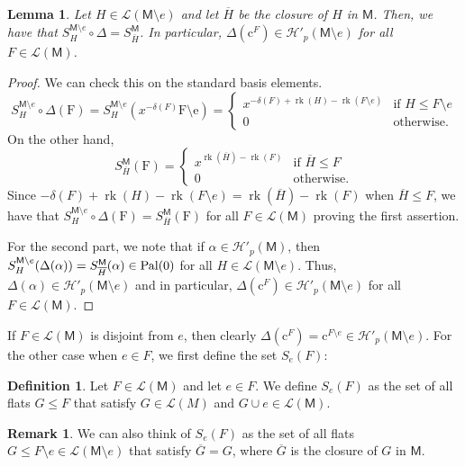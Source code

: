 \documentclass[12pt,letterpaper,english]{amsart}
\theoremstyle{teoremas}
\newtheorem{lemma}[theorem]{Lemma}
\theoremstyle{definition}
\newtheorem{definition}[theorem]{Definition}
\newtheorem{remark}[theorem]{Remark}
\DeclareMathOperator{\rk}{rk}
\newcommand{\M}{\mathsf{M}}
\newcommand{\cH}{\mathcal{H}}
\newcommand{\calL}{\mathcal{L}}
\newcommand{\Ebasis}[1]{\mathrm{#1}}
\newcommand{\Cbasis}[1]{\mathrm{c}^{#1}}
\newcommand{\pal}{\normalfont\text{Pal}}
\begin{document}
\begin{lemma}
    Let \(H \in \calL(\M \setminus e)\) and let \(\overline{H}\) be the closure of \(H\) in \(\M\).
    Then, we have that \(S^{\M\setminus e}_H \circ \Delta =
    S^{\M}_{\overline{H}}\).
    In particular, \(\Delta(\Cbasis{F}) \in \cH'_p(\M \setminus e)\) for all \(F \in \calL(\M)\).
\end{lemma}
\begin{proof}
    We can check this on the standard basis elements.
    \[
        S^{\M\setminus e}_H \circ \Delta (\Ebasis{F})= S^{\M\setminus e}_H (x^{-\delta(F)} \Ebasis{F \setminus e})
        = \begin{cases} x^{-\delta(F)+\rk(H)-\rk(F\setminus e)} & \text{if } H \le F \setminus e \\ 0 & \text{otherwise}. \end{cases}
    \]
    On the other hand,
    \[
        S^{\M}_{\overline{H}} (\Ebasis{F}) = \begin{cases} x^{\rk(\overline{H})-\rk(F)} & \text{if } \overline{H} \le F \\ 0 & \text{otherwise}. \end{cases}
    \]
    Since \(-\delta(F)+\rk(H)-\rk(F\setminus e) = \rk(\overline{H})-\rk(F)\) when \(\overline{H} \le F\),
    we have that \(S^{\M\setminus e}_H \circ \Delta (\Ebasis{F}) = S^{\M}_{\overline{H}} (\Ebasis{F})\) for all \(F \in \calL(\M)\)
    proving the first assertion.

    \noindent For the second part, we note that if \(\alpha \in \cH'_p(\M)\),
    then \(S^{\M\setminus e}_H(\Delta(\alpha)) = S^{\M}_{\overline{H}}(\alpha) \in \pal(0)\) for all
    \(H \in \calL(\M\setminus e)\).
    Thus, \(\Delta(\alpha) \in \cH'_p(\M \setminus e)\) and in particular,
    \(\Delta(\Cbasis{F}) \in \cH'_p(\M \setminus e)\) for all \(F \in \calL(\M)\).   
\end{proof}

If \(F \in \calL(\M)\) is disjoint from \(e\), then clearly
\(\Delta(\Cbasis{F}) = \Cbasis{F \setminus e}\in
\cH'_p(\M \setminus e)\). For the other case when \(e\in F\),
we first define the set \(S_e(F)\):

\begin{definition}
    Let \(F \in \calL(\M)\) and let \(e \in F\).
    We define \(S_e(F)\) as the set of all flats \(G \leq F\) that
    satisfy \(G \in \calL(M)\) and \(G \cup e \in \calL(\M)\).
\end{definition}

\begin{remark}
    We can also think of \(S_e(F)\) as the set of all flats
    \(G \leq F\setminus e \in \calL(\M\setminus e)\) that
    satisfy \(\overline{G} = G\), where \(\overline{G}\) is the closure of \(G\) in \(\M\).
\end{remark}
\end{document}
